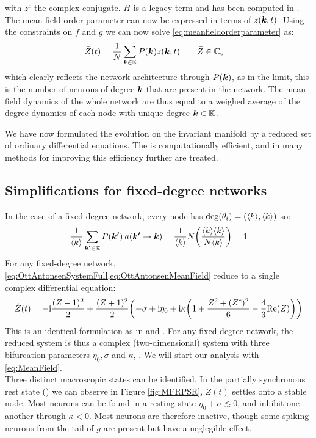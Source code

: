 with $z^c$ the complex conjugate. $H$ is a legacy term and has been computed in \cite{Martens2020}.
The mean-field order parameter can now be expressed in terms of $z({\boldsymbol{k}},t)$. Using the constraints on $f$ and $g$ we can now solve \eqref{eq:meanfieldorderparameter} as:
\begin{align}
\bar{Z}(t) &= \frac{1}{N} \sum_{{\boldsymbol{k}} \in {\mathbb{K}}} P({\boldsymbol{k}}) z({\boldsymbol{k}}, t) \qquad \bar{Z} \in \mathbb{C}_\circ \label{eq:OttAntonsenMeanField}
\end{align}
which clearly reflects the network architecture through $P({\boldsymbol{k}})$, as in the limit, this is the number of neurons of degree ${\boldsymbol{k}}$ that are present in the network. The mean-field dynamics of the whole network are thus equal to a weighed average of the degree dynamics of each node with unique degree ${\boldsymbol{k}} \in {\mathbb{K}}$. 

We have now formulated the evolution on the invariant manifold by a reduced set of ordinary differential equations. The \MFR is computationally efficient, and in \cite{OttAntonsen2017} many methods for improving this efficiency further are treated.


\subsection{Simplifications for fixed-degree networks}
In the case of a fixed-degree network, every node has $\deg (\theta_i) = ({\langle k\rangle}, {\langle k\rangle})$ so:
\begin{align*}
    \frac{1}{\kmean} \sum_{\kacc \in \K} P\left(\kacc\right) \: a\left(\kacc \rightarrow \k\right) = \frac{1}{\kmean} N \left( \frac{\kmean \kmean}{N \kmean} \right) = 1
\end{align*}
For any fixed-degree network, \cref{eq:OttAntonsenSystemFull,eq:OttAntonsenMeanField} reduce to a single complex differential equation:
\begin{align}
\dot{Z}(t)= -\ic \frac{(Z-1)^2}{2}+\frac{(Z+1)^2}{2} \left(-\sigma+ \ic\eta_{0}
+ \ic \kappa \left(1+\frac{Z^{2} + (Z^c)^{2} }{6} - \frac{4}{3} \Re(Z)\right)\right) \label{eq:MeanField}
\end{align}
This is an identical formulation as in \cite{Luke2013} and \cite{Martens2020}. For any fixed-degree network, the reduced system is thus a complex (two-dimensional) system with three bifurcation parameters $\eta_0, \sigma$ and $\kappa$, \cite{Luke2013, Martens2020}. We will start our analysis with \eqref{eq:MeanField}.\\

Three distinct macroscopic states can be identified. In the partially synchronous rest state (\PSR) we can observe in Figure \ref{fig:MFRPSR}, $Z(t)$ settles onto a stable node. Most neurons can be found in a resting state $\eta_0 + \sigma \lesssim 0$, and inhibit one another through $\kappa < 0$. Most neurons are therefore inactive, though some spiking neurons from the tail of $g$ are present but have a neglegible effect. \\

